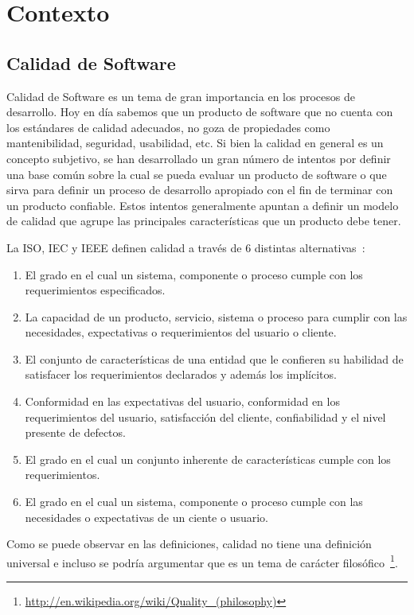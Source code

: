 
\chapter{Contexto}

\section{Calidad de Software}
Calidad de Software es un tema de gran importancia en los procesos de desarrollo.
Hoy en día sabemos que un producto de software que no cuenta con los estándares de
calidad adecuados, no goza de propiedades como mantenibilidad, seguridad, usabilidad, etc.
Si bien la calidad en general es un concepto subjetivo, se han desarrollado un gran
número de intentos por definir una base común sobre la cual se pueda evaluar un producto 
de software o que sirva para definir un proceso de desarrollo apropiado con el fin de terminar
con un producto confiable. Estos intentos generalmente apuntan a definir un modelo
de calidad que agrupe las principales características que un producto debe tener.

La ISO, IEC y IEEE definen calidad a través de 6 distintas alternativas~\cite{5276043}:
\begin{enumerate}
    \item El grado en el cual un sistema, componente o proceso cumple con los requerimientos especificados.
    \item La capacidad de un producto, servicio, sistema o proceso para cumplir con las necesidades, expectativas
    o requerimientos del usuario o cliente.
    \item El conjunto de características de una entidad que le confieren su habilidad de satisfacer los requerimientos
    declarados y además los implícitos.
    \item Conformidad en las expectativas del usuario, conformidad en los requerimientos del usuario, satisfacción del cliente,
    confiabilidad y el nivel presente de defectos.
    \item El grado en el cual un conjunto inherente de características cumple con los requerimientos.
    \item El grado en el cual un sistema, componente o proceso cumple con las necesidades o expectativas de un ciente o usuario.
\end{enumerate}

Como se puede observar en las definiciones, calidad no tiene una definición universal e incluso se podría argumentar
que es un tema de carácter filosófico~\footnote{\url{http://en.wikipedia.org/wiki/Quality_(philosophy)}}.

